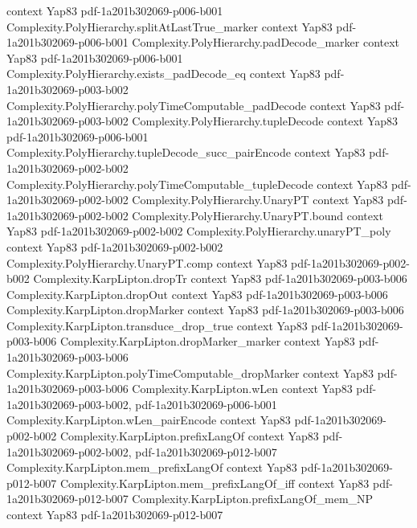 \begin{theorem}
  {context}
  {Yap83}
  {pdf-1a201b302069-p006-b001}
\proofstep
  {Complexity.PolyHierarchy.splitAtLastTrue_marker}
  {context}
  {Yap83}
  {pdf-1a201b302069-p006-b001}
\proofstep
  {Complexity.PolyHierarchy.padDecode_marker}
  {context}
  {Yap83}
  {pdf-1a201b302069-p006-b001}
\proofstep
  {Complexity.PolyHierarchy.exists_padDecode_eq}
  {context}
  {Yap83}
  {pdf-1a201b302069-p003-b002}
\proofstep
  {Complexity.PolyHierarchy.polyTimeComputable_padDecode}
  {context}
  {Yap83}
  {pdf-1a201b302069-p003-b002}
\proofstep
  {Complexity.PolyHierarchy.tupleDecode}
  {context}
  {Yap83}
  {pdf-1a201b302069-p006-b001}
\proofstep
  {Complexity.PolyHierarchy.tupleDecode_succ_pairEncode}
  {context}
  {Yap83}
  {pdf-1a201b302069-p002-b002}
\proofstep
  {Complexity.PolyHierarchy.polyTimeComputable_tupleDecode}
  {context}
  {Yap83}
  {pdf-1a201b302069-p002-b002}
\proofstep
  {Complexity.PolyHierarchy.UnaryPT}
  {context}
  {Yap83}
  {pdf-1a201b302069-p002-b002}
\proofstep
  {Complexity.PolyHierarchy.UnaryPT.bound}
  {context}
  {Yap83}
  {pdf-1a201b302069-p002-b002}
\proofstep
  {Complexity.PolyHierarchy.unaryPT_poly}
  {context}
  {Yap83}
  {pdf-1a201b302069-p002-b002}
\proofstep
  {Complexity.PolyHierarchy.UnaryPT.comp}
  {context}
  {Yap83}
  {pdf-1a201b302069-p002-b002}
\proofstep
  {Complexity.KarpLipton.dropTr}
  {context}
  {Yap83}
  {pdf-1a201b302069-p003-b006}
\proofstep
  {Complexity.KarpLipton.dropOut}
  {context}
  {Yap83}
  {pdf-1a201b302069-p003-b006}
\proofstep
  {Complexity.KarpLipton.dropMarker}
  {context}
  {Yap83}
  {pdf-1a201b302069-p003-b006}
\proofstep
  {Complexity.KarpLipton.transduce_drop_true}
  {context}
  {Yap83}
  {pdf-1a201b302069-p003-b006}
\proofstep
  {Complexity.KarpLipton.dropMarker_marker}
  {context}
  {Yap83}
  {pdf-1a201b302069-p003-b006}
\proofstep
  {Complexity.KarpLipton.polyTimeComputable_dropMarker}
  {context}
  {Yap83}
  {pdf-1a201b302069-p003-b006}
\proofstep
  {Complexity.KarpLipton.wLen}
  {context}
  {Yap83}
  {pdf-1a201b302069-p003-b002,
    pdf-1a201b302069-p006-b001}
\proofstep
  {Complexity.KarpLipton.wLen_pairEncode}
  {context}
  {Yap83}
  {pdf-1a201b302069-p002-b002}
\proofstep
  {Complexity.KarpLipton.prefixLangOf}
  {context}
  {Yap83}
  {pdf-1a201b302069-p002-b002,
    pdf-1a201b302069-p012-b007}
\proofstep
  {Complexity.KarpLipton.mem_prefixLangOf}
  {context}
  {Yap83}
  {pdf-1a201b302069-p012-b007}
\proofstep
  {Complexity.KarpLipton.mem_prefixLangOf_iff}
  {context}
  {Yap83}
  {pdf-1a201b302069-p012-b007}
\proofstep
  {Complexity.KarpLipton.prefixLangOf_mem_NP}
  {context}
  {Yap83}
  {pdf-1a201b302069-p012-b007}

\end{theorem}
